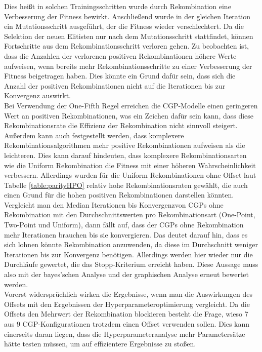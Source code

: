Dies heißt in solchen Trainingsschritten wurde durch Rekombination eine Verbesserung der Fitness bewirkt.
Anschließend wurde in der gleichen Iteration ein Mutationsschritt ausgeführt, der die Fitness wieder verschlechtert.
Da die Selektion der neuen Elitisten nur nach dem Mutationsschritt stattfindet, können Fortschritte aus dem Rekombinationsschritt verloren gehen.
Zu beobachten ist, dass die Anzahlen der verlorenen positiven Rekombinationen höhere Werte aufweisen, wenn bereits mehr Rekombinationsschritte zu einer Verbesserung der Fitness beigetragen haben.
Dies könnte ein Grund dafür sein, dass sich die Anzahl der positiven Rekombinationen nicht auf die Iterationen bis zur Konvergenz auswirkt.\\
Bei Verwendung der One-Fifth Regel erreichen die CGP-Modelle einen geringeren Wert an positiven Rekombinationen, was ein Zeichen dafür sein kann, dass diese Rekombinationsrate die Effizienz der Rekombination nicht sinnvoll steigert.
Außerdem kann auch festgestellt werden, dass komplexere Rekombinationsalgorithmen mehr positive Rekombinationen aufweisen als die leichteren.
Dies kann darauf hindeuten, dass komplexere Rekombinationsarten wie die Uniform Rekombination die Fitness mit einer höheren Wahrscheinlichkeit verbessern.
Allerdings wurden für die Uniform Rekombinationen ohne Offset laut Tabelle \ref{table:parityHPO} relativ hohe Rekombinationsraten gewählt, die auch einen Grund für die hohen positiven Rekombinationen darstellen könnten.\\
Vergleicht man den \glqq Median Iterationen bis Konvergenz\grqq\space von CGPs ohne Rekombination mit den Durchschnittswerten pro Rekombinationsart (One-Point, Two-Point und Uniform), dann fällt auf, dass der CGPs ohne Rekombination mehr Iterationen brauchen bis sie konvergieren.
Das deutet darauf hin, dass es sich lohnen könnte Rekombination anzuwenden, da diese im Durchschnitt weniger Iterationen bis zur Konvergenz benötigen.
Allerdings werden hier wieder nur die Durchläufe gewertet, die das Stopp-Kriterium erreicht haben.
Diese Aussage muss also mit der bayes'schen Analyse und der graphischen Analyse erneut bewertet werden.\\
Vorerst widersprüchlich wirken die Ergebnisse, wenn man die Auswirkungen des Offsets mit den Ergebnissen der Hyperparameteroptimierung vergleicht.
Da die Offsets den Mehrwert der Rekombination blockieren besteht die Frage, wieso 7 aus 9 CGP-Kon\-fi\-gu\-ra\-tionen trotzdem einen Offset verwenden sollen.
Dies kann einerseits daran liegen, dass die Hyperparameteranalyse mehr Parametersätze hätte testen müssen, um auf effizientere Ergebnisse zu stoßen.
